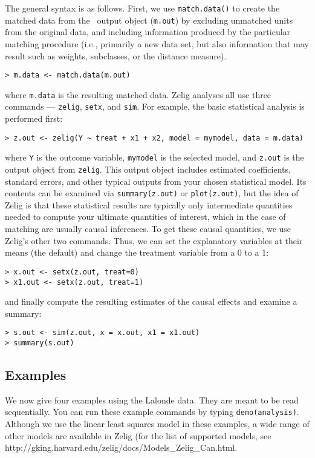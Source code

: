 The general syntax is as follows. First, we use \texttt{match.data()}
to create the matched data from the \MatchIt\ output object
(\texttt{m.out}) by excluding unmatched units from the original data,
and including information produced by the particular matching
procedure (i.e., primarily a new data set, but also information that
may result such as weights, subclasses, or the distance measure).
\begin{verbatim}
> m.data <- match.data(m.out)
\end{verbatim}
where {\tt m.data} is the resulting matched data.  Zelig analyses all
use three commands --- \texttt{zelig}, \texttt{setx}, and
\texttt{sim}.  For example, the basic statistical analysis is
performed first:
\begin{verbatim}
> z.out <- zelig(Y ~ treat + x1 + x2, model = mymodel, data = m.data)
\end{verbatim}
where {\tt Y} is the outcome variable, {\tt mymodel} is the selected
model, and {\tt z.out} is the output object from {\tt zelig}.  This
output object includes estimated coefficients, standard errors, and
other typical outputs from your chosen statistical model.  Its
contents can be examined via \texttt{summary(z.out)} or
\texttt{plot(z.out)}, but the idea of Zelig is that these statistical
results are typically only intermediate quantities needed to compute
your ultimate quantities of interest, which in the case of matching
are usually causal inferences.  To get these causal quantities, we use
Zelig's other two commands.  Thus, we can set the explanatory
variables at their means (the default) and change the treatment
variable from a 0 to a 1:
\begin{verbatim}
> x.out <- setx(z.out, treat=0)
> x1.out <- setx(z.out, treat=1)
\end{verbatim}
and finally compute the resulting estimates of the causal effects and
examine a summary:
\begin{verbatim}
> s.out <- sim(z.out, x = x.out, x1 = x1.out)
> summary(s.out)
\end{verbatim}

\subsection{Examples}

We now give four examples using the Lalonde data.  They are meant to
be read sequentially.  You can run these example commands by typing
{\tt demo(analysis)}.  Although we use the linear least squares model
in these examples, a wide range of other models are available in Zelig
(for the list of supported models, see
{http://gking.harvard.edu/zelig/docs/Models_Zelig_Can.html}.

